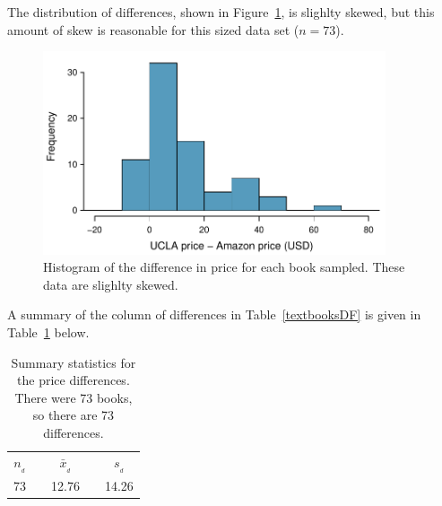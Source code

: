 The distribution of differences, shown in Figure~\ref{diffInTextbookPricesS10}, is %
slighlty skewed, but this amount of skew is reasonable for this sized data set ($n=73$). 


\begin{figure}[H]
\centering
\includegraphics[width=0.9\textwidth]{05/figures/textbooksS10/diffInTextbookPricesS10}
\captionsetup{width=0.6\textwidth}
\caption{Histogram of the difference in price for each book sampled. These data are %
slighlty skewed.}
\label{diffInTextbookPricesS10}
\end{figure}



A summary of the column of differences in Table~\ref{textbooksDF} is given in
Table~\ref{textbooksSummaryStats} below.

\begin{table}[H]
\centering
\begin{tabular}{ccccc}
\hline
$n_{_{d}}$	&\hspace{3mm}& $\bar{x}_{_{d}}$	&\hspace{3mm}& $s_{_{d} }$ \vspace{1mm}\\
73			&			& 12.76			&			& 14.26 \\
\hline
\end{tabular}
\captionsetup{width=0.6\textwidth}
\caption{Summary statistics for the price differences. There were 73 books, so there are 73 differences.}
\label{textbooksSummaryStats}
\end{table}


